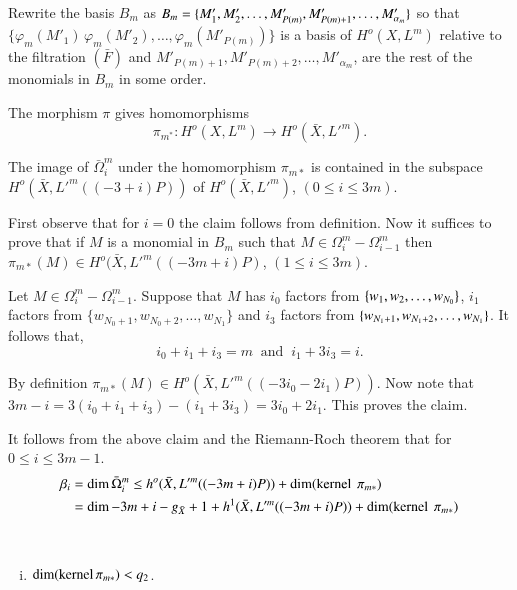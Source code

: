 {Rewrite the basis $B_{m}$ as $B_{m} = \{M'_{1}, M'_{2}, \ldots,
M'_{P(m)}, M'_{P(m)+1} , \ldots,\break M'_{\alpha_{m}}\}$ so that
$\{\varphi_{m} (M'_{1})\, \varphi_{m}(M'_{2}), \ldots,
\varphi_{m}(M'_{P(m)})\}$ is a basis of  $H^o (X, L^{m})$ relative
to the filtration $(\bar{F})$ and $M'_{P(m)+1}, M'_{P(m)+2}, \ldots ,
M'_{\alpha_{ m}} $,  are the rest of the monomials in $B_{m}$ in some
order.  

The morphism $\pi$ gives homomorphisms
$$
\pi_{m^*} : H^o (X, L^{m}) \longrightarrow H^o (\bar{X} , L'^{m}).  
$$

\begin{claim*}
The image  of $\bar{\Omega}^{m}_{i}$ under the homomorphism $\pi_{m*}$
is contained in the subspace $H^o (\bar{X}, L'^{m}((-3+i) P))$ of 
$H^o(\bar{X}, L'^{m})$, $(0 \le i \le 3m)$.  
\end{claim*}

\medskip
{}
First observe that for $i=0$ the claim follows from definition. Now it
suffices to prove that if $M$ is a monomial in $B_{m}$ such that $M
\in \Omega^{m}_{i} - \Omega^{m}_{i-1}$ then
$\pi_{m*}(M)\in H^o (\bar{X},L'^m((-3m+i)P)$, $(1 \leq i \leq
3m)$. 

Let $M \in \Omega_i^m - \Omega^m_{i-1}$. Suppose that $M$ has
$i_{0}$ factors from $\{w_{1}, w_{2}, \ldots,\break w_{N_{0}}\}$, $i_{1}$
factors from $\{w_{N_{0}+1} , w_{N_{0}+2}, \ldots, w_{N_{1}} \}$ and
$i_{3}$ factors from $\{w_{N_{1}+1},\break w_{N_{1}+2},\ldots , w_{N_{1}}
\}$. It follows that,  
$$
i_{0} + i_{1} + i_{3} = m ~\text{ and }~ i_{1} + 3i_{3} = i. 
$$\pageoriginale

By definition $\pi_{m*} (M) \in H^o (\bar{X}, L'^{m}
((-3i_{0} - 2i_{1}) P))$. Now note that $3m - i = 3(i_{0} + i_{1} +
i_{3}) - (i_{1} + 3i_{3}) = 3i_{0} + 2i_{1}$. This proves the claim.  

It follows from the above claim and the Riemann-Roch theorem that for
$0 \leq i \leq 3m-1$.  
\begin{align*}
\beta_{i} & = \dim \bar{\Omega}^{m}_{i} \leq h^{o} (\bar{X}, L'^{m}
((-3m+i) P)) + \dim (\operatorname{kernel} ~\pi_{m*})\\ 
 & = \dim - 3m + i - g_{\bar{X}} + 1 + h^{1} (\bar{X}, L'^{m}
((-3m+i)P)) + \dim (\operatorname{kernel} ~\pi_{m*} ) 
\end{align*}


\begin{claim*}
~\begin{enumerate}[i)]
\item $\dim (\operatorname{kernel}  \pi_{m*}) < q_{2}$.


\end{enumerate}
\end{claim*}}
